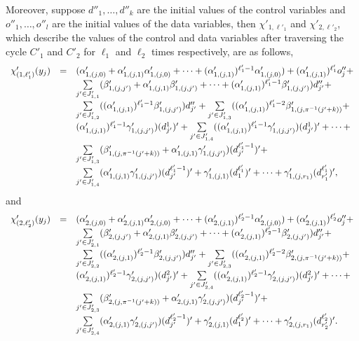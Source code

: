 Moreover, suppose $d''_1,\dots,d''_k$ are the initial values of the control variables and $o''_1,\dots,o''_l$ are the initial values of the data variables, then $\chi'_{1,\ell'_1}$ and $\chi'_{2,\ell'_2}$, which describe the values of the control and data variables after traversing the cycle $C'_1$ and $C'_2$ for $\ell_1$ and $\ell_2$ times respectively, are as follows, 
%
\[
\begin{array}{l c l}
\chi'_{(1,\ell'_1)}(y_j)  & = & (\alpha'_{1,(j,0)} + \alpha'_{1,(j,1)} \alpha'_{1,(j,0)}+ \dots +(\alpha'_{1,(j,1)})^{\ell'_1-1} \alpha'_{1,(j,0)}) + (\alpha'_{1,(j,1)})^{\ell'_1} o''_j + \\
& & \sum \limits_{j' \in J'_{1,1}} (\beta'_{1,(j,j')}+\alpha'_{1,(j,1)}\beta'_{1,(j,j')} + \dots +(\alpha'_{1,(j,1)})^{\ell'_1-1}  \beta'_{1,(j,j')}) d''_{j'} + \\
%
& & \sum \limits_{j' \in J'_{1,2}} ( (\alpha'_{1,(j,1)})^{\ell'_1-1} \beta'_{1,(j,j')}) d''_{j'} +  \sum \limits_{j' \in J'_{1,3}} ( (\alpha'_{1,(j,1)})^{\ell'_1-2} \beta'_{1,(j, \pi^{-1}(j'+k))}+\\
%
& &  (\alpha'_{1,(j,1)})^{\ell'_1-1} \gamma'_{1,(j,j')}) (d^1_{j'})' +  \sum \limits_{j' \in J'_{1,4}} ( (\alpha'_{1,(j,1)})^{\ell'_1-1} \gamma'_{1,(j,j')}) (d^1_{j'})' + \dots +  \\
%
& & \sum \limits_{j' \in J'_{1,3}} (\beta'_{1,(j, \pi^{-1}(j'+k))}+\alpha'_{1,(j,1)}\gamma'_{1,(j,j')}) (d^{\ell'_1-1}_{j'})' +\\
& & \sum \limits_{j' \in J'_{1,4}} (\alpha'_{1,(j,1)} \gamma'_{1,(j,j')}) (d^{\ell'_1-1}_{j'})' + \gamma'_{1,(j, 1)} (d^{\ell'_1}_{1})' + \dots + \gamma'_{1,(j,r_1)} (d^{\ell'_1}_{r'_1})',
\end{array} 
\]
and
\[
\begin{array}{l c l}
\chi'_{(2,\ell'_2)}(y_j)  & = & (\alpha'_{2,(j,0)} + \alpha'_{2,(j,1)} \alpha'_{2,(j,0)}+ \dots +(\alpha'_{2,(j,1)})^{\ell'_2-1} \alpha'_{2,(j,0)}) + (\alpha'_{2,(j,1)})^{\ell'_2} o''_j + \\
& & \sum \limits_{j' \in J'_{2,1}} (\beta'_{2,(j,j')}+\alpha'_{2,(j,1)}\beta'_{2,(j,j')} + \dots +(\alpha'_{2,(j,1)})^{\ell'_2-1}  \beta'_{2,(j,j')}) d''_{j'} + \\
%
& & \sum \limits_{j' \in J'_{2,2}} ( (\alpha'_{2,(j,1)})^{\ell'_2-1} \beta'_{2,(j,j')}) d''_{j'} +  \sum \limits_{j' \in J'_{2,3}} ( (\alpha'_{2,(j,1)})^{\ell'_2-2} \beta'_{2,(j, \pi^{-1}(j'+k))}+\\
%
& &  (\alpha'_{2,(j,1)})^{\ell'_2-1} \gamma'_{2,(j,j')}) (d^2_{j'})' +  \sum \limits_{j' \in J'_{2,4}} ( (\alpha'_{2,(j,1)})^{\ell'_2-1} \gamma'_{2,(j,j')}) (d^2_{j'})' + \dots +  \\
%
& & \sum \limits_{j' \in J'_{2,3}} (\beta'_{2,(j, \pi^{-1}(j'+k))}+\alpha'_{2,(j,1)}\gamma'_{2,(j,j')}) (d^{\ell'_2-1}_{j'})' +\\
& & \sum \limits_{j' \in J'_{2,4}} (\alpha'_{2,(j,1)} \gamma'_{2,(j,j')}) (d^{\ell'_2-1}_{j'})' + \gamma'_{2,(j, 1)} (d^{\ell'_2}_{1})' + \dots + \gamma'_{2,(j,r_1)} (d^{\ell'_2}_{r'_2})'.
\end{array} 
\]



